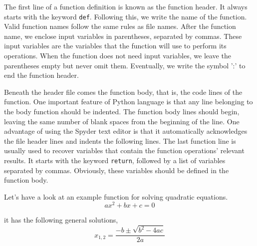 \begin{paracol}{2}
The first line of a function definition is known as the function header. It always starts with the keyword \texttt{def}. Following this, we write the name of the function. Valid function names follow the same rules as file names. After the function name, we enclose input variables in parentheses, separated by commas. These input variables are the variables that the function will use to perform its operations. When the function does not need input variables, we leave the parentheses empty but never omit them. Eventually, we write the symbol ':' to end the function header.

Beneath the header file comes the function body, that is, the code lines of the function. One important feature of Python language is that any line belonging to the body function should be indented. The function body lines should begin, leaving the same number of blank spaces from the beginning of the line. One advantage of using the Spyder text editor is that it automatically acknowledges the file header lines and indents the following lines. The last function line is usually used to recover variables that contain the function operations' relevant results. It starts with the keyword \texttt{return}, followed by a list of variables separated by commas. Obviously, these variables should be defined in the function body.

Let's have a look at an example function for solving quadratic equations.
\begin{equation*}
ax^2+bx+c=0
\end{equation*}

it has the following general solutions,
\begin{equation*}
    x_{1,2} = \frac{-b\pm \sqrt{b^2-4ac}}{2a}
\end{equation*}
\end{paracol}

